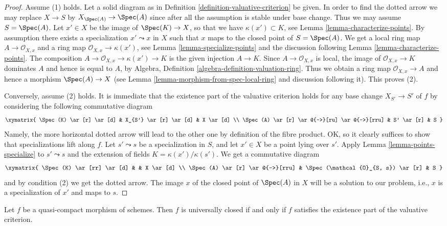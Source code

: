 \begin{proof}
Assume (1) holds. Let a solid diagram as in
Definition \ref{definition-valuative-criterion} be given.
In order to find the dotted arrow we may replace $X \to S$
by $X_{\Spec(A)} \to \Spec(A)$ since after all
the assumption is stable under base change.
Thus we may assume $S = \Spec(A)$.
Let $x' \in X$ be the image of $\Spec(K) \to X$, so
that we have $\kappa(x') \subset K$, see
Lemma \ref{lemma-characterize-points}.
By assumption there exists a specialization $x' \leadsto x$
in $X$ such that $x$ maps to the closed point of $S = \Spec(A)$.
We get a local ring map $A \to \mathcal{O}_{X, x}$ and a ring
map $\mathcal{O}_{X, x} \to \kappa(x')$, see
Lemma \ref{lemma-specialize-points} and the discussion following
Lemma \ref{lemma-characterize-points}. The composition
$A \to \mathcal{O}_{X, x} \to \kappa(x') \to K$ is the
given injection $A \to K$. Since $A \to \mathcal{O}_{X, x}$
is local, the image of $\mathcal{O}_{X, x} \to K$
dominates $A$ and hence is equal to $A$, by
Algebra, Definition \ref{algebra-definition-valuation-ring}.
Thus we obtain a ring map $\mathcal{O}_{X, x} \to A$ and
hence a morphism $\Spec(A) \to X$
(see Lemma \ref{lemma-morphism-from-spec-local-ring} and
discussion following it). This proves (2).

\medskip\noindent
Conversely, assume (2) holds. It is immediate that
the existence part of the valuative criterion holds for
any base change $X_{S'} \to S'$ of $f$ by considering
the following commutative diagram
$$
\xymatrix{
\Spec(K) \ar[r] \ar[d] & X_{S'} \ar[r] \ar[d] & X \ar[d] \\
\Spec(A) \ar[r] \ar@{-->}[ru] \ar@{-->}[rru] & S' \ar[r] & S
}
$$
Namely, the more horizontal dotted arrow will lead to the
other one by definition of the fibre product. OK, so it clearly
suffices to show that specializations lift along $f$.
Let $s' \leadsto s$ be a specialization in $S$, and let
$x' \in X$ be a point lying over $s'$. Apply
Lemma \ref{lemma-points-specialize}
to $s' \leadsto s$ and the extension of fields
$K = \kappa(x')/\kappa(s')$.
We get a commutative diagram
$$
\xymatrix{
\Spec(K) \ar[rr] \ar[d] & & X \ar[d] \\
\Spec(A) \ar[r] \ar@{-->}[rru] &
\Spec(\mathcal{O}_{S, s}) \ar[r] & S
}
$$
and by condition (2) we get the dotted arrow.
The image $x$ of the closed point of $\Spec(A)$
in $X$ will be a solution to our problem, i.e.,
$x$ is a specialization of $x'$ and maps to $s$.
\end{proof}

\begin{proposition}
\label{proposition-characterize-universally-closed}
Let $f$ be a quasi-compact morphism of schemes.
Then $f$ is universally closed if and only if $f$
satisfies the existence part of the valuative criterion.
\end{proposition}


